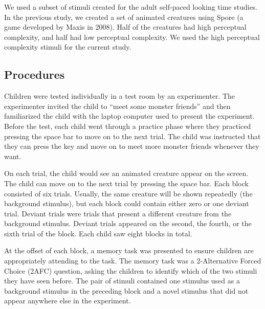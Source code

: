 \documentclass[10pt, letterpaper]{article}
\begin{document}
We used a subset of stimuli created for the adult self-paced looking
time studies. In the previous study, we created a set of animated
creatures using Spore (a game developed by Maxis in 2008). Half of the
creatures had high perceptual complexity, and half had low perceptual
complexity. We used the high perceptual complexity stimuli for the
current study.

\hypertarget{procedures}{%
\subsection{Procedures}\label{procedures}}

Children were tested individually in a test room by an experimenter. The
experimenter invited the child to ``meet some monster friends'' and then
familiarized the child with the laptop computer used to present the
experiment. Before the test, each child went through a practice phase
where they practiced pressing the space bar to move on to the next
trial. The child was instructed that they can press the key and move on
to meet more monster friends whenever they want.

On each trial, the child would see an animated creature appear on the
screen. The child can move on to the next trial by pressing the space
bar. Each block consisted of six trials. Usually, the same creature will
be shown repeatedly (the background stimulus), but each block could
contain either zero or one deviant trial. Deviant trials were trials
that present a different creature from the background stimulus. Deviant
trials appeared on the second, the fourth, or the sixth trial of the
block. Each child saw eight blocks in total.

At the offset of each block, a memory task was presented to ensure
children are appropriately attending to the task. The memory task was a
2-Alternative Forced Choice (2AFC) question, asking the children to
identify which of the two stimuli they have seen before. The pair of
stimuli contained one stimulus used as a background stimulus in the
preceding block and a novel stimulus that did not appear anywhere else
in the experiment.
\end{document}
